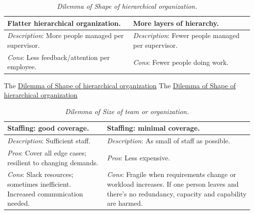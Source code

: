\begin{center}
\begin{table}[H] %
\begin{tabular}{ | m{\dilemmatablewidth}| m{\dilemmatablewidth} | } 
  \hline
  \textbf{Flatter hierarchical organization.} &
  \textbf{More layers of hierarchy.} \\ 
  \hline
  \textit{Description}: More people managed per supervisor. & 
  \textit{Description}: Fewer people managed per supervisor. \\ 
  \hline
  \textit{Cons}: Less feedback/attention per employee. & 
  \textit{Cons}: Fewer people doing work. \\  
  \hline
\end{tabular}
\caption{
\textit{Dilemma of Shape of hierarchical organization.}
}
\label{table:people-per-supervisor}
\end{table}
\end{center}


The \href{table:people-per-supervisor}{Dilemma of Shape of hierarchical organization}
The \href{table:people-per-supervisor}{Dilemma of Shape of hierarchical organization}


\begin{center}
\begin{table}[H] %
\begin{tabular}{ | m{\dilemmatablewidth}| m{\dilemmatablewidth} | } 
  \hline
  \textbf{Staffing: good coverage.} &
  \textbf{Staffing: minimal coverage.} \\
  \hline
  \textit{Description}: Sufficient staff. &
  \textit{Description}: As small of staff as possible. \\  
  \hline
  \textit{Pros}: Cover all edge cases; resilient to changing demands. &
  \textit{Pros}: Less expensive. \\
  \hline
  \textit{Cons}: Slack resources; sometimes inefficient. Increased communication needed. & 
  \textit{Cons}: Fragile when requirements change or workload increases. If one person leaves and there's no redundancy, capacity and capability are harmed.  \\
  \hline
\end{tabular}
\caption{
\textit{Dilemma of Size of team or organization.}
}
\label{table:staff-many-vs-few}
\end{table}
\end{center}


